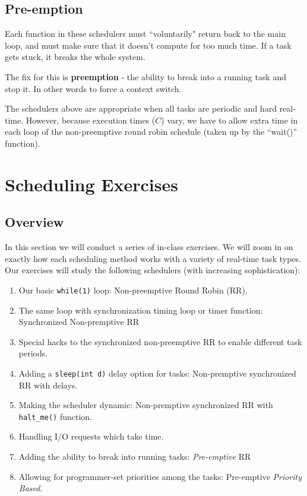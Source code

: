 \subsection{Pre-emption}
Each function in these schedulers must ``voluntarily" return back to the main loop, 
and must make sure that it doesn't compute for too much time.   If a task gets
stuck, it breaks the whole system.  

The fix for this is {\bf preemption} - the ability to break into a running task and 
stop it. In other words to force a context switch. 


The schedulers above are appropriate when all tasks are periodic and hard real-time.
However, because execution times ($C$) vary, we have to allow  extra time in
each loop of the non-preemptive round robin schedule (taken up by the ``wait()'' function).



\section{Scheduling Exercises}


\subsection{Overview}

In this section we will conduct a series of in-class exercises.  We will zoom in on exactly how each scheduling method works with a variety of real-time task types.   Our exercises will study the following schedulers (with increasing sophistication):
\begin{enumerate}
  \item Our basic {\tt while(1)} loop:  Non-preemptive Round Robin (RR).
  \item The same loop with synchronization timing loop or timer function: Synchronized Non-premptive RR
  \item Special hacks to the synchronized non-preemptive RR to enable different task periods. 
  \item Adding a {\tt sleep(int d)} delay option for tasks: Non-premptive synchronized RR with delays.
  \item Making the scheduler dynamic: Non-premptive synchronized RR with {\tt halt\_me()} function.
  \item Handling I/O requests which take time.
  \item Adding the ability to break into running tasks: {\it Pre-emptive} RR
  \item Allowing for programmer-set priorities among the tasks: Pre-emptive {\it Priority Based}.
\end{enumerate}



